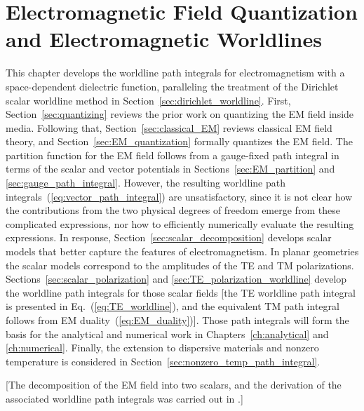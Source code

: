 \chapter[{Electromagnetic Field Quantization and \\ Electromagnetic Worldlines}]{Electromagnetic Field Quantization and Electromagnetic Worldlines}

\label{ch:EM_quantization}

This chapter develops the worldline path integrals for electromagnetism with a space-dependent
dielectric function, paralleling the treatment of the Dirichlet scalar worldline method in Section~\ref{sec:dirichlet_worldline}.  
First, Section~\ref{sec:quantizing} reviews the prior work on quantizing the EM field inside media.
Following that, Section~\ref{sec:classical_EM} reviews classical EM field theory, 
and Section~\ref{sec:EM_quantization} formally quantizes the EM field. 
The partition function for the EM field follows from a gauge-fixed path integral in terms of the scalar and vector potentials
in Sections~\ref{sec:EM_partition} and \ref{sec:gauge_path_integral}.
However, the resulting worldline path integrals~(\ref{eq:vector_path_integral}) are unsatisfactory, since
it is not clear how the contributions from the two physical degrees of freedom emerge from these complicated expressions,
nor how to efficiently numerically evaluate the resulting expressions. 
In response, Section~\ref{sec:scalar_decomposition} develops scalar models that better capture the features
of electromagnetism.
In planar geometries the scalar models correspond to the amplitudes of the TE and TM polarizations.  
Sections~\ref{sec:scalar_polarization} and \ref{sec:TE_polarization_worldline} develop the worldline path integrals for those scalar fields 
[the TE worldline path integral is presented in Eq.~(\ref{eq:TE_worldline}), 
and the equivalent TM path integral follows from EM duality~(\ref{eq:EM_duality})].
Those path integrals will form the basis for the analytical and numerical work in Chapters~\ref{ch:analytical} and \ref{ch:numerical}.  
Finally, the extension to dispersive materials and nonzero temperature is considered in Section~\ref{sec:nonzero_temp_path_integral}.

[The decomposition of the EM field into two scalars, and the derivation of the associated 
worldline path integrals was carried out in \citet{Mackrory2016}.]

